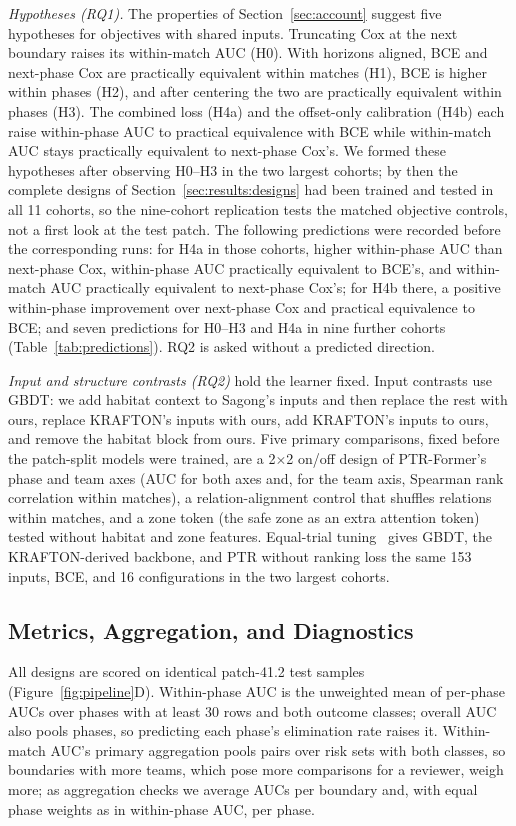 \documentclass[sigconf,anonymous]{acmart}
\begin{document}
\emph{Hypotheses (RQ1).} The properties of Section~\ref{sec:account} suggest five hypotheses for objectives with shared inputs. Truncating Cox at the next boundary raises its within-match AUC (H0). With horizons aligned, BCE and next-phase Cox are practically equivalent within matches (H1), BCE is higher within phases (H2), and after centering the two are practically equivalent within phases (H3). The combined loss (H4a) and the offset-only calibration (H4b) each raise within-phase AUC to practical equivalence with BCE while within-match AUC stays practically equivalent to next-phase Cox's. We formed these hypotheses after observing H0--H3 in the two largest cohorts; by then the complete designs of Section~\ref{sec:results:designs} had been trained and tested in all 11 cohorts, so the nine-cohort replication tests the matched objective controls, not a first look at the test patch. The following predictions were recorded before the corresponding runs: for H4a in those cohorts, higher within-phase AUC than next-phase Cox, within-phase AUC practically equivalent to BCE's, and within-match AUC practically equivalent to next-phase Cox's; for H4b there, a positive within-phase improvement over next-phase Cox and practical equivalence to BCE; and seven predictions for H0--H3 and H4a in nine further cohorts (Table~\ref{tab:predictions}). RQ2 is asked without a predicted direction.

\emph{Input and structure contrasts (RQ2)} hold the learner fixed. Input contrasts use GBDT: we add habitat context to Sagong's inputs and then replace the rest with ours, replace KRAFTON's inputs with ours, add KRAFTON's inputs to ours, and remove the habitat block from ours. Five primary comparisons, fixed before the patch-split models were trained, are a 2$\times$2 on/off design of PTR-Former's phase and team axes (AUC for both axes and, for the team axis, Spearman rank correlation within matches), a relation-alignment control that shuffles relations within matches, and a zone token (the safe zone as an extra attention token) tested without habitat and zone features. Equal-trial tuning~\cite{Bergstra12,Cawley10} gives GBDT, the KRAFTON-derived backbone, and PTR without ranking loss the same 153 inputs, BCE, and 16 configurations in the two largest cohorts.

\subsection{Metrics, Aggregation, and Diagnostics}
\label{sec:method:units}
All designs are scored on identical patch-41.2 test samples (Figure~\ref{fig:pipeline}D). Within-phase AUC is the unweighted mean of per-phase AUCs over phases with at least 30 rows and both outcome classes; overall AUC also pools phases, so predicting each phase's elimination rate raises it. Within-match AUC's primary aggregation pools pairs over risk sets with both classes, so boundaries with more teams, which pose more comparisons for a reviewer, weigh more; as aggregation checks we average AUCs per boundary and, with equal phase weights as in within-phase AUC, per phase.
\end{document}
